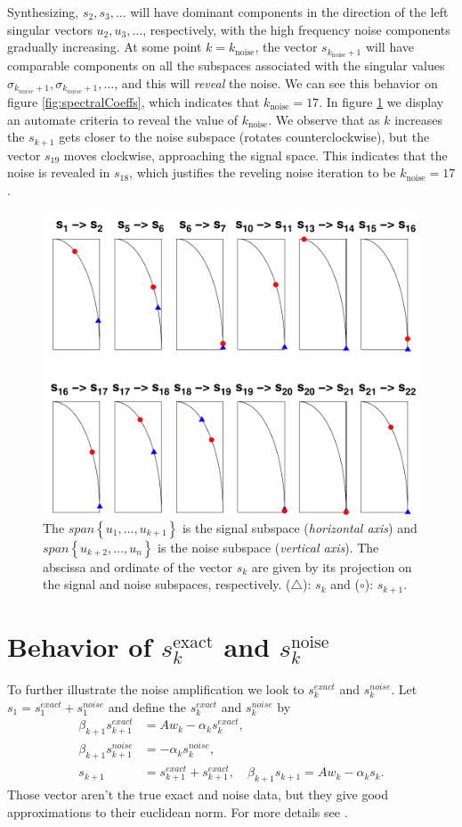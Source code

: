 \documentclass[11pt]{amsart}
\begin{document}
Synthesizing, $s_{2},s_{3},\ldots$ will have dominant components in the
direction of the left singular vectors $u_{2},u_{3},\ldots$, respectively, with
the high frequency noise components gradually increasing. At some point
$k = k_{\text{noise}}$, the vector $s_{k_{\text{noise}} + 1}$ will have
comparable components on all the subspaces associated with the singular values
$\sigma_{k_{noise} + 1}, \sigma_{k_{noise} + 1}, \ldots$, and this will 
\emph{reveal} the noise. We can see this behavior on figure 
\ref{fig:spectralCoeffs}, which indicates that $k_{\text{noise}} = 17$. In
figure \ref{fig:snSpace} we display an automate criteria to reveal the value of
$k_{\text{noise}}$. We observe that as $k$ increases the $s_{k+1}$ gets closer
to the noise subspace (rotates counterclockwise), but the vector $s_{19}$ moves
clockwise, approaching the signal space. This indicates that the noise is
revealed in $s_{18}$, which justifies the reveling noise iteration to be 
$k_{\text{noise}} = 17$.
\begin{figure}[htb] \label{fig:snSpace}
  \begin{center}
    \includegraphics[width=0.55\linewidth]{figures/run1/signal_noise_space}
  \end{center}
\caption{The $span\left\{u_{1},\ldots,u_{k+1}\right\}$ is the signal subspace 
(\emph{horizontal axis}) and $span\left\{u_{k+2},\ldots,u_{n}\right\}$ is the
noise subspace (\emph{vertical axis}). The abscissa and ordinate of the vector 
$s_{k}$ are given by its projection on the signal and noise subspaces, 
respectively. ($\triangle$): $s_{k}$ and ($\circ$): $s_{k+1}$.}
\end{figure}

\section{Behavior of $s_{k}^{\text{exact}}$ and $s_{k}^{\text{noise}}$}
To further illustrate the noise amplification we look to $s_{k}^{exact}$ and 
$s_{k}^{noise}$. Let $s_{1} = s_{1}^{exact} + s_{1}^{noise}$ and define the
$s_{k}^{exact}$ and $s_{k}^{noise}$ by
\begin{align*}
  \beta_{k+1}s_{k+1}^{exact} &= Aw_{k} - \alpha_{k}s_{k}^{exact}, \\
  \beta_{k+1}s_{k+1}^{noise} &= -\alpha_{k}s_{k}^{noise}, \\
  s_{k+1} &= s_{k+1}^{exact} + s_{k+1}^{exact}, \quad 
  \beta_{k+1}s_{k+1} = Aw_{k} - \alpha_{k}s_{k}.
\end{align*}
Those vector aren't the true exact and noise data, but they give good 
approximations to their euclidean norm. For more details see 
\cite{bidiagonalization}.
\end{document}
